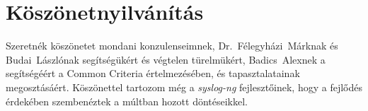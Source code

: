 \chapter*{Köszönetnyilvánítás}

Szeretnék köszönetet mondani konzulenseimnek, \mbox{Dr. Félegyházi Márknak} és \mbox{Budai
Lászlónak} segítségükért és végtelen türelmükért, \mbox{Badics Alexnek} a segítségéért a Common
Criteria értelmezésében, és tapasztalatainak megosztásáért.
Köszönettel tartozom még a \emph{syslog-ng} fejlesztőinek, hogy a fejlődés érdekében szembenéztek
a múltban hozott döntéseikkel.
